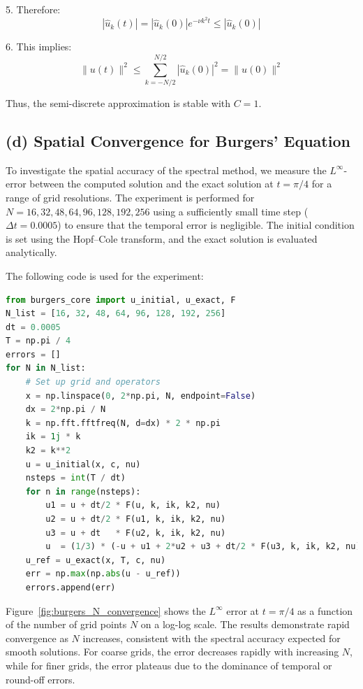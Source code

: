 \documentclass{article}
\begin{document}
5. Therefore:
\begin{equation}
    |\hat{u}_k(t)| = |\hat{u}_k(0)|e^{-\nu k^2t} \leq |\hat{u}_k(0)|
\end{equation}

6. This implies:
\begin{equation}
    \|u(t)\|^2 \leq \sum_{k=-N/2}^{N/2} |\hat{u}_k(0)|^2 = \|u(0)\|^2
\end{equation}

Thus, the semi-discrete approximation is stable with $C = 1$.

\subsection*{(d) Spatial Convergence for Burgers' Equation}
To investigate the spatial accuracy of the spectral method, we measure the $L^\infty$-error between the computed solution and the exact solution at $t = \pi/4$ for a range of grid resolutions. The experiment is performed for $N = 16, 32, 48, 64, 96, 128, 192, 256$ using a sufficiently small time step ($\Delta t = 0.0005$) to ensure that the temporal error is negligible. The initial condition is set using the Hopf--Cole transform, and the exact solution is evaluated analytically.

The following code is used for the experiment:

\begin{lstlisting}[language=Python]
from burgers_core import u_initial, u_exact, F
N_list = [16, 32, 48, 64, 96, 128, 192, 256]
dt = 0.0005
T = np.pi / 4
errors = []
for N in N_list:
    # Set up grid and operators
    x = np.linspace(0, 2*np.pi, N, endpoint=False)
    dx = 2*np.pi / N
    k = np.fft.fftfreq(N, d=dx) * 2 * np.pi
    ik = 1j * k
    k2 = k**2
    u = u_initial(x, c, nu)
    nsteps = int(T / dt)
    for n in range(nsteps):
        u1 = u + dt/2 * F(u, k, ik, k2, nu)
        u2 = u + dt/2 * F(u1, k, ik, k2, nu)
        u3 = u + dt   * F(u2, k, ik, k2, nu)
        u  = (1/3) * (-u + u1 + 2*u2 + u3 + dt/2 * F(u3, k, ik, k2, nu))
    u_ref = u_exact(x, T, c, nu)
    err = np.max(np.abs(u - u_ref))
    errors.append(err)
\end{lstlisting}

Figure~\ref{fig:burgers_N_convergence} shows the $L^\infty$ error at $t = \pi/4$ as a function of the number of grid points $N$ on a log-log scale. The results demonstrate rapid convergence as $N$ increases, consistent with the spectral accuracy expected for smooth solutions. For coarse grids, the error decreases rapidly with increasing $N$, while for finer grids, the error plateaus due to the dominance of temporal or round-off errors.
\end{document}
